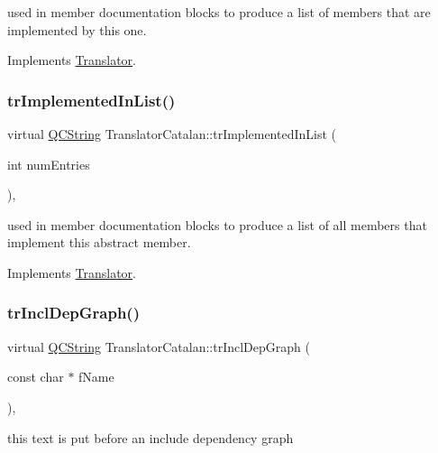used in member documentation blocks to produce a list of members that are implemented by this one. 

Implements \mbox{\hyperlink{class_translator}{Translator}}.

\mbox{\label{class_translator_catalan_a3e4fb08378d5131fc5190e99f4586ca4}} 
\subsubsection{\texorpdfstring{trImplementedInList()}{trImplementedInList()}}
{\footnotesize\ttfamily virtual \mbox{\hyperlink{class_q_c_string}{Q\+C\+String}} Translator\+Catalan\+::tr\+Implemented\+In\+List (\begin{DoxyParamCaption}\item[{int}]{num\+Entries }\end{DoxyParamCaption})\hspace{0.3cm}{\ttfamily [inline]}, {\ttfamily [virtual]}}

used in member documentation blocks to produce a list of all members that implement this abstract member. 

Implements \mbox{\hyperlink{class_translator}{Translator}}.

\mbox{\label{class_translator_catalan_aa6b9d4a9e6c250c7a554e79f102d129b}} 
\subsubsection{\texorpdfstring{trInclDepGraph()}{trInclDepGraph()}}
{\footnotesize\ttfamily virtual \mbox{\hyperlink{class_q_c_string}{Q\+C\+String}} Translator\+Catalan\+::tr\+Incl\+Dep\+Graph (\begin{DoxyParamCaption}\item[{const char $\ast$}]{f\+Name }\end{DoxyParamCaption})\hspace{0.3cm}{\ttfamily [inline]}, {\ttfamily [virtual]}}

this text is put before an include dependency graph 

